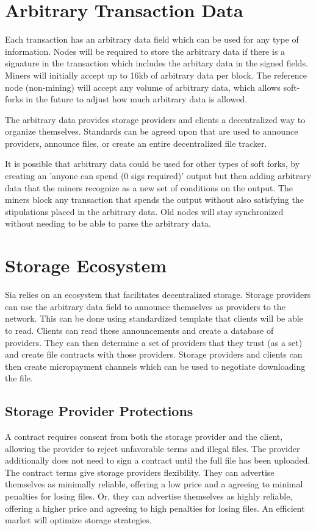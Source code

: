 \documentclass[twocolumn]{article}
\begin{document}
\section{Arbitrary Transaction Data}
Each transaction has an arbitrary data field which can be used for any type of information.
Nodes will be required to store the arbitrary data if there is a signature in the transaction which includes the arbitary data in the signed fields.
Miners will initially accept up to 16kb of arbitrary data per block.
The reference node (non-mining) will accept any volume of arbitrary data, which allows soft-forks in the future to adjust how much arbitrary data is allowed.

The arbitrary data provides storage providers and clients a decentralized way to organize themselves.
Standards can be agreed upon that are used to announce providers, announce files, or create an entire decentralized file tracker.

It is possible that arbitrary data could be used for other types of soft forks, by creating an 'anyone can spend (0 sigs required)' output but then adding arbitrary data that the miners recognize as a new set of conditions on the output.
The miners block any transaction that spends the output without also satisfying the stipulations placed in the arbitrary data.
Old nodes will stay synchronized without needing to be able to parse the arbitrary data.

\section{Storage Ecosystem}
Sia relies on an ecosystem that facilitates decentralized storage.
Storage providers can use the arbitrary data field to announce themselves as providers to the network.
This can be done using standardized template that clients will be able to read.
Clients can read these announcements and create a database of providers.
They can then determine a set of providers that they trust (as a set) and create file contracts with those providers.
Storage providers and clients can then create micropayment channels \cite{mpc} which can be used to negotiate downloading the file.

\subsection{Storage Provider Protections}
A contract requires consent from both the storage provider and the client, allowing the provider to reject unfavorable terms and illegal files.
The provider additionally does not need to sign a contract until the full file has been uploaded.
The contract terms give storage providers flexibility.
They can advertise themselves as minimally reliable, offering a low price and a agreeing to minimal penalties for losing files.
Or, they can advertise themselves as highly reliable, offering a higher price and agreeing to high penalties for losing files.
An efficient market will optimize storage strategies.
\end{document}
